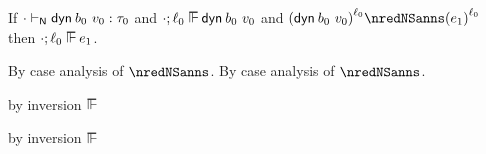 \begin{lemma}\label{H-dyn-label-preservation}\leavevmode
  If\/ $\snil \sWTN \edynb{\sbnd_0}{\svalue_0} : \stype_0$
  and\/ $\snil; \sowner_0 \sWSOP \edynb{\sbnd_0}{\svalue_0}$
  and\/ $\obars{\edynb{\sbnd_0}{\svalue_0}}{\sowner_0} \nredNSanns \obars{\sexpr_1}{\sowner_0}$
  then\/ $\snil; \sowner_0 \sWSOP \sexpr_1$.
\end{lemma}{
  \newcommand{\shortproof}{By case analysis of $\nredNSanns$.}
\begin{lamportproof*}
  \shortproof
\mainproof
  \shortproof

    \begin{pfproof}
      by inversion $\sWSOP$
    \end{pfproof}

    \begin{pfproof}
      by inversion $\sWSOP$
    \end{pfproof}

    \begin{pfproof}
      \qedstep
        \begin{pfproof}
          \begin{mathpar}
          \end{mathpar}
        \end{pfproof}
    \end{pfproof}


\end{lamportproof*}}
